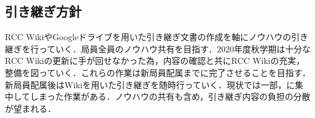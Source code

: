 \subsection*{引き継ぎ方針}


RCC WikiやGoogleドライブを用いた引き継ぎ文書の作成を軸にノウハウの引き継ぎを行っていく．局員全員のノウハウ共有を目指す．2020年度秋学期は十分なRCC Wikiの更新に手が回せなかった為，内容の確認と共にRCC Wikiの充実，整備を図っていく．これらの作業は新局員配属までに完了させることを目指す．新局員配属後はWikiを用いた引き継ぎを随時行っていく．現状では一部，\thirdGrade{}に集中してしまった作業がある．ノウハウの共有も含め，引き継ぎ内容の負担の分散が望まれる．
